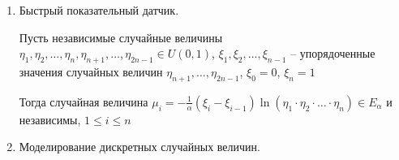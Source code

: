 \begin{enumerate}
\begin{enumerate}[label*=\Roman*. ]
\begin{MyTheorem}
            $X = \sqrt{-2\ln \eta_1} \cos (2 \pi \eta_2)$

            $Y = \sqrt{-2\ln \eta_1} \sin (2 \pi \eta_2)$
        \end{MyTheorem}
        
        \begin{MyProof}
            Пусть $X, Y \in N(0, 1)$ независимы, тогда плотность $f_{X, Y}(x, y) = f_X(x)f_Y(y) = \frac{1}{2\pi} e^{-\frac{1}{2} (x^2 + y^2)}$

            Перейдем к полярным координатам:

            $x = r \cos \varphi, y = r \sin \varphi, |J| = r$

            Плотность: $f_{\Phi, R}(\varphi, r) = \frac{1}{2\pi} e^{-\frac{1}{2}r^2} r$

            Так как $\varphi \in U(0, 2\pi)$, то $f_{\Phi}(\varphi) = \frac{1}{2\pi}$ и $f_{\Phi, R}(\varphi, r) = \underset{f_\Phi}{\underbrace{\frac{1}{2\pi}}} \cdot \underset{f_R}{\underbrace{r e^{-\frac{1}{2}r^2}}} \Longrightarrow \Phi$ и $R$ -- независимы 

            Смоделируем $f_R$ методом обратной функции

            $F_R(r) = \int_0^r r e^{-\frac{r^2}{2}} dr = -\int_0^r r e^{-\frac{r^2}{2}} d\left(-\frac{r^2}{2}\right) = e^{-\frac{r^2}{2}} \Big|_0^r = 1 - e^{-\frac{r^2}{2}} = \eta_1$. Тогда $r = \sqrt{-2\ln \eta_1}$

            Аналогично $F_\Phi(\varphi) = \int_0^\varphi \frac{1}{2\pi} d\varphi = \frac{\varphi}{2\pi} = \eta_2 \Longrightarrow \varphi = 2\pi \eta_2$
        \end{MyProof}
    \end{enumerate}

    \item Быстрый показательный датчик.

    \begin{MyTheorem}
        \Ths Пусть независимые случайные величины $\eta_1, \eta_2, \dots, \eta_n, \eta_{n+1}, \dots, \eta_{2n - 1} \in U(0, 1)$, $\xi_1, \xi_2, \dots, \xi_{n - 1}$ -- упорядоченные значения случайных величин $\eta_{n + 1}, \dots, \eta_{2n - 1}$, $\xi_0 = 0$, $\xi_n = 1$
    
        Тогда случайная величина $\mu_i = -\frac{1}{\alpha}(\xi_i - \xi_{i - 1}) \ln (\eta_1 \cdot \eta_2 \cdot \dots \cdot \eta_n) \in E_\alpha$ и независимы, $1 \leq i \leq n$
    \end{MyTheorem}

    \item Моделирование дискретных случайных величин.


\end{enumerate}
